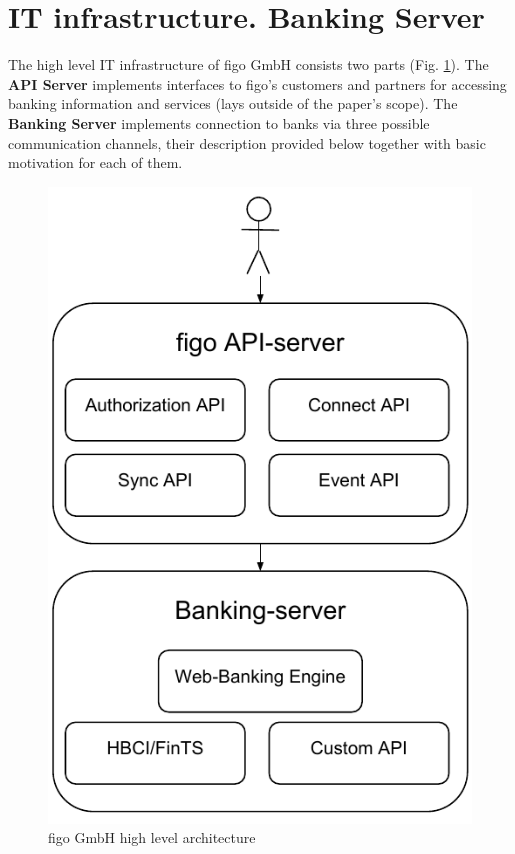 \section{IT infrastructure. Banking Server}
The high level IT infrastructure of figo GmbH consists two parts (Fig. \ref{fig:figoArch}). The \textbf{API Server} implements interfaces to figo's customers and partners for accessing banking information and services (lays outside of the paper's scope). The \textbf{Banking Server} implements connection to banks via three possible communication channels, their description provided below together with basic motivation for each of them.
\begin{figure}[ht]
  	\label{fig:figoArch}
    \centering
    \includegraphics[scale=0.7]{grafiken/figoArch}
     \caption{figo GmbH high level architecture}
\end{figure}

